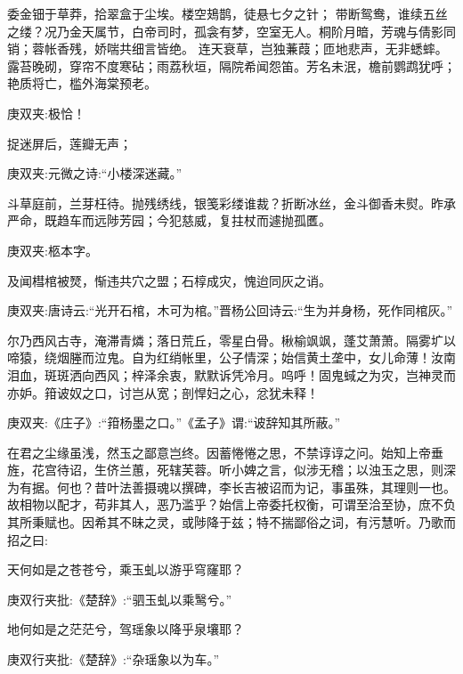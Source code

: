 \begin{qute2sp}
\begin{parag}
        委金钿于草莽，拾翠盒于尘埃。楼空鳷鹊，徒悬七夕之针；
        带断鸳鸯，谁续五丝之缕？况乃金天属节，白帝司时，孤衾有梦，空室无人。桐阶月暗，芳魂与倩影同销；蓉帐香残，娇喘共细言皆绝。
        连天衰草，岂独蒹葭；匝地悲声，无非蟋蟀。
        露苔晚砌，穿帘不度寒砧；雨荔秋垣，隔院希闻怨笛。芳名未泯，檐前鹦鹉犹呼；艳质将亡，槛外海棠预老。
        \begin{note}庚双夹:极恰！\end{note}
        捉迷屏后，莲瓣无声；
        \begin{note}庚双夹:元微之诗:“小楼深迷藏。”\end{note}
        斗草庭前，兰芽枉待。抛残绣线，银笺彩缕谁裁？折断冰丝，金斗御香未熨。昨承严命，既趋车而远陟芳园；今犯慈威，复拄杖而遽抛孤匶。\begin{note}庚双夹:柩本字。
        \end{note}及闻槥棺被燹，惭违共穴之盟；石椁成灾，愧迨同灰之诮。
        \begin{note}庚双夹:唐诗云:“光开石棺，木可为棺。”晋杨公回诗云:“生为并身杨，死作同棺灰。”\end{note}
        尔乃西风古寺，淹滞青燐；落日荒丘，零星白骨。楸榆飒飒，蓬艾萧萧。隔雾圹以啼猿，绕烟塍而泣鬼。自为红绡帐里，公子情深；始信黄土垄中，女儿命薄！汝南泪血，斑斑洒向西风；梓泽余衷，默默诉凭冷月。呜呼！固鬼蜮之为灾，岂神灵而亦妒。箝诐奴之口，讨岂从宽；剖悍妇之心，忿犹未释！
        \begin{note}庚双夹:《庄子》:“箝杨墨之口。”《孟子》谓:“诐辞知其所蔽。”\end{note}
        在君之尘缘虽浅，然玉之鄙意岂终。因蓄惓惓之思，不禁谆谆之问。始知上帝垂旌，花宫待诏，生侪兰蕙，死辖芙蓉。听小婢之言，似涉无稽；以浊玉之思，则深为有据。何也？昔叶法善摄魂以撰碑，李长吉被诏而为记，事虽殊，其理则一也。故相物以配才，苟非其人，恶乃滥乎？始信上帝委托权衡，可谓至洽至协，庶不负其所秉赋也。因希其不昧之灵，或陟降于兹；特不揣鄙俗之词，有污慧听。乃歌而招之曰:
    \end{parag}


    \begin{poem}
        \begin{pl}天何如是之苍苍兮，乘玉虬以游乎穹窿耶？\end{pl}
        \begin{note}庚双行夹批:《楚辞》:“驷玉虬以乘鹥兮。”\end{note}

        \begin{pl}地何如是之茫茫兮，驾瑶象以降乎泉壤耶？\end{pl}
        \begin{note}庚双行夹批:《楚辞》:“杂瑶象以为车。”\end{note}


\end{poem}
\end{qute2sp}
